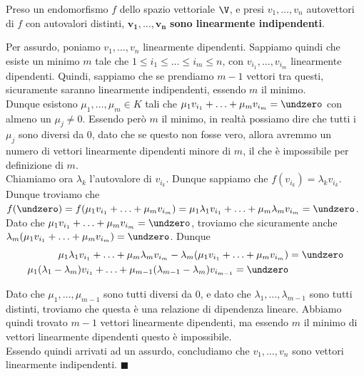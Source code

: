 \documentclass[11pt, a4paper, titlepage, oneside]{scrbook}
\begin{document}
\begin{Proposizione}[]
\label{propos-autovettori con autovalori distinti indipendenti}
Preso un endomorfismo $f$ dello spazio vettoriale $\V$, e presi $v_1, \ldots, v_n$ autovettori di $f$ con autovalori distinti, $\bm{v_1, \ldots, v_n}$ \textbf{sono linearmente indipendenti}.
\end{Proposizione}

\Dimostrazione \nopagebreak

Per assurdo, poniamo $v_1, \ldots, v_n$ linearmente dipendenti. Sappiamo quindi che esiste un minimo $m$ tale che $1 \leq i_1 \leq \ldots \leq i_m \leq n$, con $v_{i_1}, \ldots, v_{i_m}$ linearmente dipendenti. Quindi, sappiamo che se prendiamo $m-1$ vettori tra questi, sicuramente saranno linearmente indipendenti, essendo $m$ il minimo. \\
Dunque esistono $\mu_1, \ldots, \mu_m \in K$ tali che $\mu_1 v_{i_1}+ \ldots + \mu_m v_{i_m} = \undzero$ con almeno un $\mu_j \neq 0$. Essendo però $m$ il minimo, in realtà possiamo dire che tutti i $\mu_j$ sono diversi da $0$, dato che se questo non fosse vero, allora avremmo un numero di vettori linearmente dipendenti minore di $m$, il che è impossibile per definizione di $m$. \\
Chiamiamo ora $\lambda_k$ l'autovalore di $v_{i_k}$. Dunque sappiamo che $f(v_{i_k}) = \lambda_k v_{i_k}$. Dunque troviamo che \mbox{$f(\undzero) = f(\mu_1 v_{i_1} + \ldots + \mu_m v_{i_m}) = \mu_1 \lambda_1 v_{i_1} + \ldots + \mu_m \lambda_m v_{i_m} = \undzero$}. Dato che $\mu_1 v_{i_1} +\ldots + \mu_m v_{i_m} = \undzero$, troviamo che sicuramente anche $\lambda_m (\mu_1 v_{i_1} + \ldots + \mu_m v_{i_m}) = \undzero$. Dunque 
\begin{align*}
 \mu_1 \lambda_1 v_{i_1} + \ldots + \mu_m \lambda_m v_{i_m} - \lambda_m (\mu_1 v_{i_1} + \ldots + \mu_m v_{i_m}) &= \undzero \\
 \mu_1 (\lambda_1 - \lambda_m) v_{i_1} + \ldots + \mu_{m-1} (\lambda_{m-1} - \lambda_m) v_{i_{m-1}} = \undzero
\end{align*}

Dato che $\mu_1, \ldots, \mu_{m-1}$ sono tutti diversi da $0$, e dato che $\lambda_1, \ldots, \lambda_{m-1}$ sono tutti distinti, troviamo che questa è una relazione di dipendenza lineare. Abbiamo quindi trovato $m-1$ vettori linearmente dipendenti, ma essendo $m$ il minimo di vettori linearmente dipendenti questo è impossibile. \\
Essendo quindi arrivati ad un assurdo, concludiamo che $v_1, \ldots, v_n$ sono vettori linearmente indipendenti. $\blacksquare$
\end{document}
